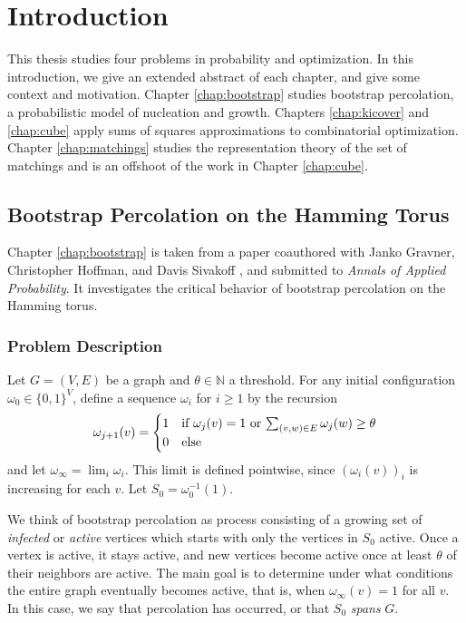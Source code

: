 

\chapter{Introduction}
\label{chap:introduction}

This thesis studies four problems in probability and optimization.
In this introduction, we give an extended abstract of each chapter, and give some context and motivation.
Chapter \ref{chap:bootstrap} studies bootstrap percolation, a probabilistic model of nucleation and growth.
Chapters \ref{chap:kicover} and \ref{chap:cube} apply sums of squares approximations to combinatorial optimization.
Chapter \ref{chap:matchings} studies the representation theory of the set of matchings and is an offshoot of the work in Chapter \ref{chap:cube}.

\section{Bootstrap Percolation on the Hamming Torus}
Chapter \ref{chap:bootstrap} is taken from a paper coauthored with Janko Gravner, Christopher Hoffman, and Davis Sivakoff \cite{bootstrappaper}, and submitted to \emph{Annals of Applied Probability}. %
It investigates the critical behavior of bootstrap percolation on the Hamming torus.

\subsection{Problem Description}
\label{section:bootstrap1}
Let $G = (V,E)$ be a graph and $\theta \in \mathbb{N}$ a threshold.
For any initial configuration $\omega_0 \in \{0,1\}^V$, define a sequence $\omega_i$ for $i \ge 1$ by the recursion
$$
\omega_{j+1}(v)=
\begin{cases}
1& \text{if $\omega_j(v)=1$ or $\sum_{(v,w) \in E}\omega_j(w) \geq
\theta$}\\
0 &\text{else}
\end{cases}
$$
and let $\omega_\infty = \lim_i \omega_i$. This limit is defined pointwise, since $(\omega_i(v))_i$ is increasing for each $v$.
Let $S_0 = \omega_0^{-1}(1)$.

We think of bootstrap percolation as process consisting of a growing set of {\em infected} or {\em active} vertices which starts with only the vertices in $S_0$ active.
Once a vertex is active, it stays active, and new vertices become active once at least $\theta$ of their neighbors are active.
The main goal is to determine under what conditions the entire graph eventually becomes active, that is, when $\omega_\infty(v) = 1$ for all $v$.
In this case, we say that percolation has occurred, or that $S_0$ {\em spans} $G$.


